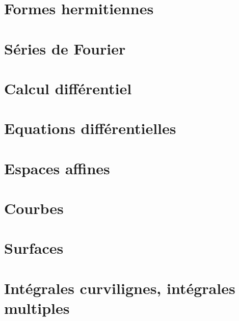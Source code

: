 \documentclass{Math}
\theoremstyle{plain}
\begin{document}
\part{Formes hermitiennes}
% 
% 
% 
% 
\part{Séries de Fourier}

% 
% 
% 
% 
\part{Calcul différentiel}
% 
% 
% 
% 
\part{Equations différentielles}
% 
% 
% 
% 
% 
% 
\part{Espaces affines}
% 
% 
% 
% 
\part{Courbes}
% 
% 
% 
% 
\part{Surfaces}
% 
% 
% 
% 
\part{Intégrales curvilignes, intégrales multiples}
% 
% 
% 
% 

\printindex
\end{document}
